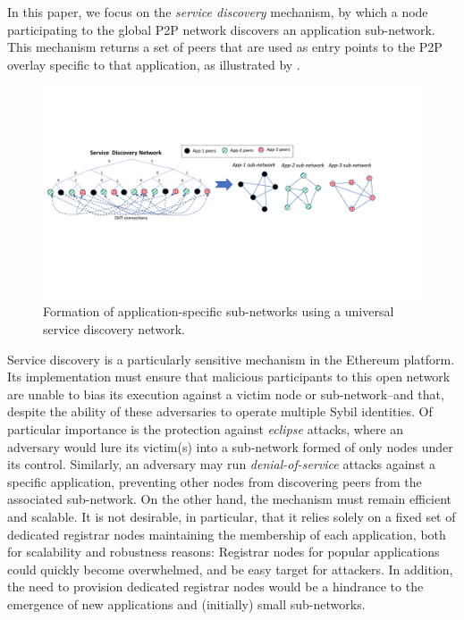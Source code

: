 In this paper, we focus on the \emph{service discovery} mechanism, by which a node participating to the global P2P network discovers an application sub-network.
This mechanism returns a set of peers that are used as entry points to the P2P overlay specific to that application, as illustrated by .

\begin{figure}[b!]
    \includegraphics[width=1\linewidth]{img/subnetwork}
    \caption{Formation of application-specific sub-networks using a universal service discovery network.
    }
    \label{fig:subnetwork}
\end{figure}

Service discovery is a particularly sensitive mechanism in the Ethereum platform.
Its implementation must ensure that malicious participants to this open network are unable to bias its execution against a victim node or sub-network--and that, despite the ability of these adversaries to operate multiple Sybil identities.
Of particular importance is the protection against \emph{eclipse} attacks, where an adversary would lure its victim(s) into a sub-network formed of only nodes under its control. %
Similarly, an adversary may run \emph{denial-of-service} attacks against a specific application, preventing other nodes from discovering peers from the associated sub-network.
On the other hand, the mechanism must remain efficient and scalable.
It is not desirable, in particular, that it relies solely on a fixed set of dedicated registrar nodes maintaining the membership of each application, both for scalability and robustness reasons: Registrar nodes for popular applications could quickly become overwhelmed, and be easy target for attackers.
In addition, the need to provision dedicated registrar nodes would be a hindrance to the emergence of new applications and (initially) small sub-networks.

